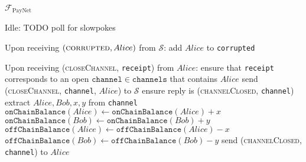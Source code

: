 \begin{functionality}{$\mathcal{F}_{\mathrm{PayNet}}$}
\begin{algorithmic}[1]
    \State Idle: TODO poll for slowpokes
    \State

    \State Upon receiving $\left(\textsc{corrupted}, Alice\right)$ from
    $\mathcal{S}$:
    \Indent
      \State add $Alice$ to \texttt{corrupted}
    \EndIndent
    \State

    \State Upon receiving (\textsc{closeChannel}, \texttt{receipt}) from $Alice$:
    \Indent
      \State ensure that \texttt{receipt} corresponds to an open
      $\mathtt{channel} \in \mathtt{channels}$ that contains $Alice$
      \State send (\textsc{closeChannel}, \texttt{channel}, $Alice$) to
      $\mathcal{S}$
      \State ensure reply is (\textsc{channelClosed}, \texttt{channel})
      \State extract $Alice, Bob, x, y$ from \texttt{channel}
      \State $\mathtt{onChainBalance}\left(Alice\right) \gets
      \mathtt{onChainBalance}\left(Alice\right) + x$
      \State $\mathtt{onChainBalance}\left(Bob\right) \gets
      \mathtt{onChainBalance}\left(Bob\right) + y$
      \State $\mathtt{offChainBalance}\left(Alice\right) \gets
      \mathtt{offChainBalance}\left(Alice\right) - x$
      \State $\mathtt{offChainBalance}\left(Bob\right) \gets
      \mathtt{offChainBalance}\left(Bob\right) - y$
      \State send (\textsc{channelClosed}, \texttt{channel}) to $Alice$
    \EndIndent
  \end{algorithmic}
\end{functionality}
